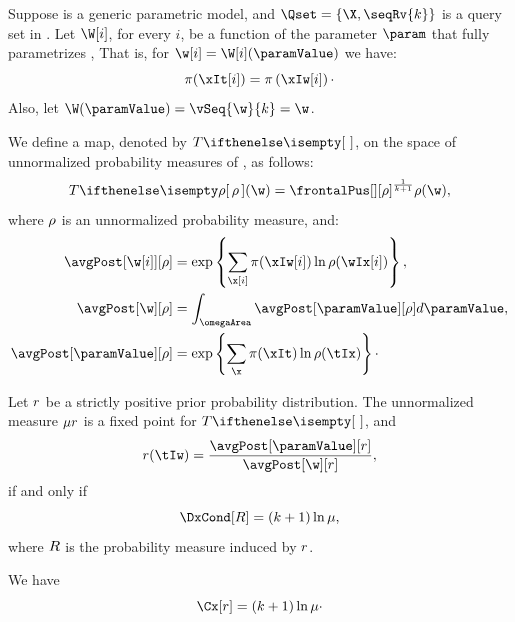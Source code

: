 \begin{theorem}
    \label{th:fixed_point}
    Suppose \pmodel is a generic parametric model, and $\Qset = \{\X, \seqRv{k}\}$ is a query set in \Mt.
    Let $\W[i]$, for every $i$, be a function of the parameter $\param$ that fully parametrizes \X[i],
    That is, for $\w[i] = \W[i](\paramValue)$ we have:
    \begin{equation}
        \pi(\xIt[i]) = \pi \left( \xIw[i] \right)\cdot
        \label{eq:func_of_theta}
    \end{equation}
    Also, let $\W(\paramValue) = \vSeq{\w}{k} = \w$.

    We define a map, denoted by $\fpMap{}$, on the space of unnormalized probability measures of \w, as follows:
    \begin{equation}
        \fpMap{\unnorm}(\w) = \frontalPus[][\unnorm]^{\frac{1}{k+1}} \unnorm(\w),
        \label{eq:pus_frontal}
    \end{equation}
    where $\rho$ is an unnormalized probability measure, and:
    \begin{align*}
        \avgPost[{\w[i]}][\rho] &= \exp \left\{\sum_{\x[i]} \pi(\xIw[i]) \ln \rho(\wIx[i]) \right\},\\
        \avgPost[\w][\rho] &= \int_{\omegaArea} \avgPost[\paramValue][\rho] d\paramValue,\\
        \avgPost[\paramValue][\rho] &= \exp \left\{\sum_{\x} \pi(\xIt) \ln \rho(\tIx) \right\} \cdot\\
    \end{align*}

    Let $r$ be a strictly positive prior probability distribution.
    The unnormalized measure $\mu r$ is a fixed point for $\fpMap{}$, and
    \begin{equation}
        \solPrior(\tIw) = \frac{\avgPost[\paramValue][\solPrior]}{\avgPost[\w][\solPrior]},
        \label{eq:pus_th_conditional}
    \end{equation}
    if and only if
    \begin{equation}
        \DxCond[\solDist] = (k + 1) \ln \normConst,
        \label{eq:pus_th_Dx_is_const}
    \end{equation}
    where $R$ is the probability measure induced by $r$.
\end{theorem}

\begin{proposition}
    We have
    \begin{equation*}
        \Cx[\solPrior] = (k + 1) \ln \normConst \cdot
    \end{equation*}
\end{proposition}

